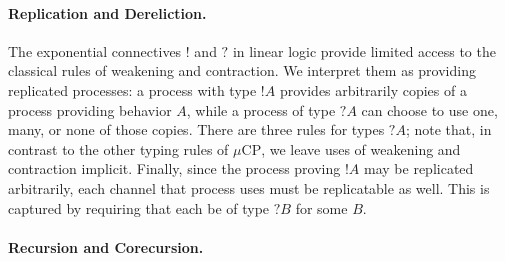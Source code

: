 \documentclass[orivec,envcountsame]{llncs}
\newcommand{\cpbang}[1]{{! #1}}
\newcommand{\cpquery}[1]{{? #1}}
\newcommand{\mucp}{$\mu\mathrm{CP}$\xspace}
\begin{document}
\paragraph{Replication and Dereliction.}

The exponential connectives $!$ and $?$ in linear logic provide limited access to the classical
rules of weakening and contraction.  We interpret them as providing replicated processes: a process
with type $\cpbang{A}$ provides arbitrarily copies of a process providing behavior $A$, while a
process of type $\cpquery{A}$ can choose to use one, many, or none of those copies.  There are three
rules for types $\cpquery{A}$; note that, in contrast to the other typing rules of \mucp, we leave
uses of weakening and contraction implicit.  Finally, since the process proving $\cpbang{A}$ may be
replicated arbitrarily, each channel that process uses must be replicatable as well.  This is
captured by requiring that each be of type $\cpquery{B}$ for some $B$.

\paragraph{Recursion and Corecursion.}
\end{document}
